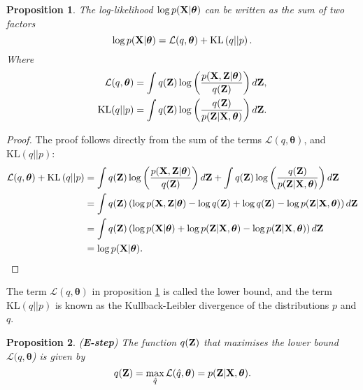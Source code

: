 \documentclass[11pt]{article}
\numberwithin{equation}{section}
\newcommand{\KL}[2]{\text{KL}\left(#1 \vert\vert #2\right)}
\newcommand{\Z}{{\bf Z}}
\newtheorem{proposition}{Proposition}[section]
\begin{document}
\begin{proposition} \label{prop:log-likelihood-partition}
	The log-likelihood $\log p({\bf X} \vert \boldsymbol{\theta})$ can be written as the sum of two factors
	\begin{equation}
		\log p({\bf X} \vert \boldsymbol{\theta}) = \mathcal{L}(q, \boldsymbol{\theta}) +\KL{q}{p}.
	\end{equation}
	Where
	\begin{align}
		\mathcal{L}(q, \boldsymbol{\theta}) &= \int q({\bf Z})\log\left(\frac{p({\bf X}, {\bf Z} \vert \boldsymbol\theta)}{q({\bf Z})}\right) d{\bf Z},\\
		\text{KL}(q \vert\vert p) &= \int q({\bf Z}) \log\left(\frac{q({\bf Z})}{p({\bf Z}\vert {\bf X}, \boldsymbol\theta)}\right) d{\bf Z}.
	\end{align}
\end{proposition}

\begin{proof}
	The proof follows directly from the sum of the terms $\mathcal{L}(q, \boldsymbol{\theta})$, and  $\text{KL}(q \vert\vert p)$:
	\begin{align}
		\mathcal{L}(q, \boldsymbol{\theta}) + \KL{q}{p} &= \int q({\bf Z})\log\left(\frac{p({\bf X}, {\bf Z} \vert \boldsymbol\theta)}{q({\bf Z})}\right) d{\bf Z} + \int q({\bf Z}) \log\left(\frac{q({\bf Z})}{p({\bf Z}\vert {\bf X}, \boldsymbol\theta)}\right) d{\bf Z}\\
		&= \int q({\bf Z})\left(\log p({\bf X, {\bf Z} \vert \boldsymbol{\theta}}) - \log q({\bf Z}) + \log q({\bf Z}) - \log p({\bf Z} \vert {\bf X}, \boldsymbol\theta)\right) d{\bf Z}\\
		&= \int q({\bf Z})\left(\log p({\bf X} \vert \boldsymbol{\theta}) + \log p({\bf Z} \vert {\bf X}, \boldsymbol{\theta}) - \log p({\bf Z} \vert {\bf X}, \boldsymbol\theta)\right) d{\bf Z}\\
		&= \log p({\bf X}\vert \boldsymbol\theta).
	\end{align}
\end{proof}

The term $\mathcal{L}(q, \boldsymbol\theta)$ in proposition \ref{prop:log-likelihood-partition} is called the lower bound, and the term $\KL{q}{p}$ is known as the Kullback-Leibler divergence of the distributions $p$ and $q$. 


\begin{proposition} (\textbf{E-step})
	The function $q({\bf Z})$ that maximises the lower bound $\mathcal L(q, \boldsymbol{\theta}$) is given by
	\begin{equation}
		q(\Z) = \max_{\hat q} \mathcal{L}(\hat q, \boldsymbol\theta) = p({\bf Z} \vert {\bf X}, \boldsymbol\theta).
	\end{equation}
\end{proposition}
\end{document}
